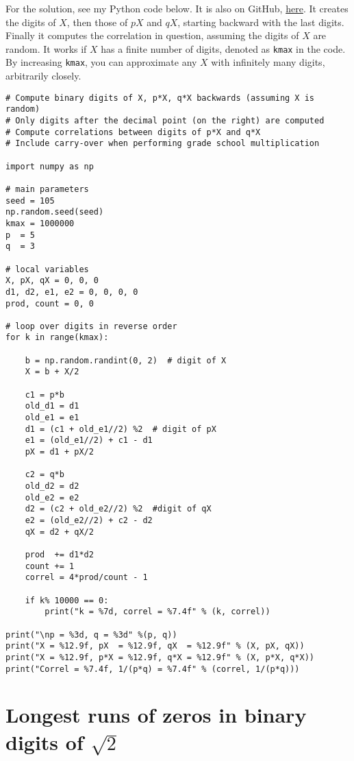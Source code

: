 \documentclass[oneside,10pt]{book}
\begin{document}
For the solution, see my Python code below. It is also on GitHub, \href{https://github.com/VincentGranville/Stochastic-Processes/blob/master/lottery_correl.py}{here}. It creates the digits of $X$, then those of $pX$ and $qX$, starting backward with the last digits. Finally it computes the correlation in question, assuming the digits of $X$ are random. It works if $X$ has a finite number of digits, denoted as \texttt{kmax} in the code. By increasing \texttt{kmax}, you can approximate any $X$ with infinitely many digits, arbitrarily closely.
\vspace{1ex} \\ 

\begin{lstlisting}
# Compute binary digits of X, p*X, q*X backwards (assuming X is random)
# Only digits after the decimal point (on the right) are computed
# Compute correlations between digits of p*X and q*X
# Include carry-over when performing grade school multiplication

import numpy as np

# main parameters
seed = 105
np.random.seed(seed)
kmax = 1000000
p  = 5
q  = 3

# local variables
X, pX, qX = 0, 0, 0
d1, d2, e1, e2 = 0, 0, 0, 0
prod, count = 0, 0 

# loop over digits in reverse order
for k in range(kmax): 

    b = np.random.randint(0, 2)  # digit of X
    X = b + X/2  

    c1 = p*b
    old_d1 = d1
    old_e1 = e1 
    d1 = (c1 + old_e1//2) %2  # digit of pX
    e1 = (old_e1//2) + c1 - d1
    pX = d1 + pX/2

    c2 = q*b
    old_d2 = d2
    old_e2 = e2 
    d2 = (c2 + old_e2//2) %2  #digit of qX
    e2 = (old_e2//2) + c2 - d2
    qX = d2 + qX/2

    prod  += d1*d2
    count += 1 
    correl = 4*prod/count - 1

    if k% 10000 == 0:  
        print("k = %7d, correl = %7.4f" % (k, correl))  

print("\np = %3d, q = %3d" %(p, q))
print("X = %12.9f, pX  = %12.9f, qX  = %12.9f" % (X, pX, qX))
print("X = %12.9f, p*X = %12.9f, q*X = %12.9f" % (X, p*X, q*X))    
print("Correl = %7.4f, 1/(p*q) = %7.4f" % (correl, 1/(p*q))) 
\end{lstlisting}


\section{Longest runs of zeros in binary digits of $\sqrt{2}$}\label{sqrt2run}
\end{document}
